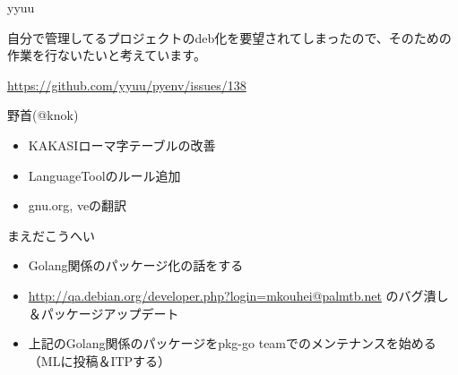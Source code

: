 \begin{prework}{ yyuu }

自分で管理してるプロジェクトのdeb化を要望されてしまったので、そのための作業を行ないたいと考えています。

\url{https://github.com/yyuu/pyenv/issues/138}

\end{prework}

\begin{prework}{ 野首(@knok) }
\begin{itemize}
\item KAKASIローマ字テーブルの改善
\item LanguageToolのルール追加
\item gnu.org, veの翻訳
\end{itemize}
\end{prework}

\begin{prework}{ まえだこうへい }

\begin{itemize}
\item Golang関係のパッケージ化の話をする
\item \url{http://qa.debian.org/developer.php?login=mkouhei@palmtb.net}
のバグ潰し＆パッケージアップデート
\item 上記のGolang関係のパッケージをpkg-go teamでのメンテナンスを始める（MLに投稿＆ITPする）
\end{itemize}
\end{prework}
